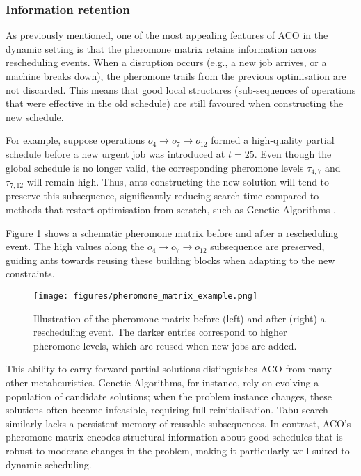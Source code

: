 \documentclass[final-report]{report-template}
\begin{document}
\subsubsection{Information retention}
As previously mentioned, one of the most appealing features of ACO in the dynamic setting is that the pheromone matrix retains information across rescheduling events. When a disruption occurs (e.g., a new job arrives, or a machine breaks down), the pheromone trails from the previous optimisation are not discarded. This means that good local structures (sub-sequences of operations that were effective in the old schedule) are still favoured when constructing the new schedule.

For example, suppose operations $o_4 \rightarrow o_7 \rightarrow o_{12}$ formed a high-quality partial schedule before a new urgent job was introduced at $t = 25$. Even though the global schedule is no longer valid, the corresponding pheromone levels $\tau_{4,7}$ and $\tau_{7,12}$ will remain high. Thus, ants constructing the new solution will tend to preserve this subsequence, significantly reducing search time compared to methods that restart optimisation from scratch, such as Genetic Algorithms \cite{8502560}.

Figure \ref{fig:pheromone-matrix} shows a schematic pheromone matrix before and after a rescheduling event. The high values along the $o_4 \rightarrow o_7 \rightarrow o_{12}$ subsequence are preserved, guiding ants towards reusing these building blocks when adapting to the new constraints.

\begin{figure}[H]
    \centering
    \texttt{[image: figures/pheromone\_matrix\_example.png]}
    \caption{Illustration of the pheromone matrix before (left) and after (right) a rescheduling event. The darker entries correspond to higher pheromone levels, which are reused when new jobs are added.}
    \label{fig:pheromone-matrix}
\end{figure}

This ability to carry forward partial solutions distinguishes ACO from many other metaheuristics. Genetic Algorithms, for instance, rely on evolving a population of candidate solutions; when the problem instance changes, these solutions often become infeasible, requiring full reinitialisation. Tabu search similarly lacks a persistent memory of reusable subsequences. In contrast, ACO's pheromone matrix encodes structural information about good schedules that is robust to moderate changes in the problem, making it particularly well-suited to dynamic scheduling.
\end{document}
